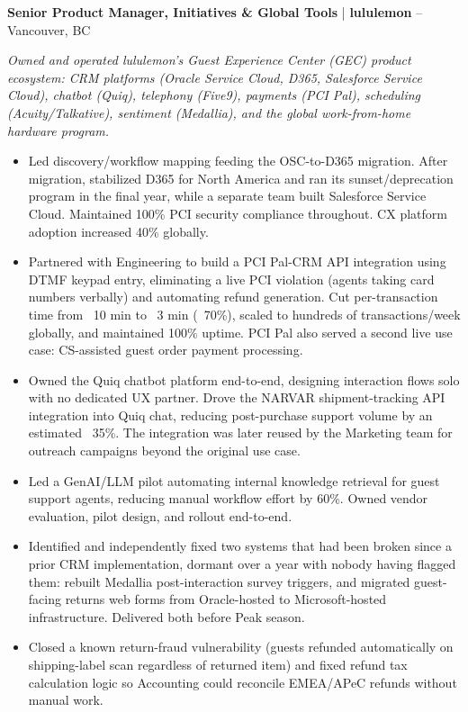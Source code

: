 \documentclass[11pt,a4paper,sans]{moderncv}
\renewcommand*{\labelitemi}{}
\newcommand{\cvoneline}[4]{%
  \noindent\textbf{#1} \normalfont | \textbf{#2} -- #3%
  \ifthenelse{\equal{#4}{}}{}{\hfill#4}%
  \par\vspace{1pt}%
}
\newcommand{\bulletitemize}{\renewcommand*{\labelitemi}{\strut\textcolor{color1}{\textbullet}}}
\begin{document}
\cvoneline{Senior Product Manager, Initiatives \& Global Tools}{lululemon}{Vancouver, BC}{Oct 2020--June 2025}
\textit{Owned and operated lululemon's Guest Experience Center (GEC) product ecosystem: CRM platforms (Oracle Service Cloud, D365, Salesforce Service Cloud), chatbot (Quiq), telephony (Five9), payments (PCI Pal), scheduling (Acuity/Talkative), sentiment (Medallia), and the global work-from-home hardware program.}
{\bulletitemize
\begin{itemize}
    \item Led discovery/workflow mapping feeding the OSC-to-D365 migration. After migration, stabilized D365 for North America and ran its sunset/deprecation program in the final year, while a separate team built Salesforce Service Cloud. Maintained 100\% PCI security compliance throughout. CX platform adoption increased 40\% globally.
    \item Partnered with Engineering to build a PCI Pal-CRM API integration using DTMF keypad entry, eliminating a live PCI violation (agents taking card numbers verbally) and automating refund generation. Cut per-transaction time from ~10 min to ~3 min (~70\%), scaled to hundreds of transactions/week globally, and maintained 100\% uptime. PCI Pal also served a second live use case: CS-assisted guest order payment processing.
    \item Owned the Quiq chatbot platform end-to-end, designing interaction flows solo with no dedicated UX partner. Drove the NARVAR shipment-tracking API integration into Quiq chat, reducing post-purchase support volume by an estimated ~35\%. The integration was later reused by the Marketing team for outreach campaigns beyond the original use case.
    \item Led a GenAI/LLM pilot automating internal knowledge retrieval for guest support agents, reducing manual workflow effort by 60\%. Owned vendor evaluation, pilot design, and rollout end-to-end.
    \item Identified and independently fixed two systems that had been broken since a prior CRM implementation, dormant over a year with nobody having flagged them: rebuilt Medallia post-interaction survey triggers, and migrated guest-facing returns web forms from Oracle-hosted to Microsoft-hosted infrastructure. Delivered both before Peak season.
    \item Closed a known return-fraud vulnerability (guests refunded automatically on shipping-label scan regardless of returned item) and fixed refund tax calculation logic so Accounting could reconcile EMEA/APeC refunds without manual work.

\end{itemize}}
\end{document}
